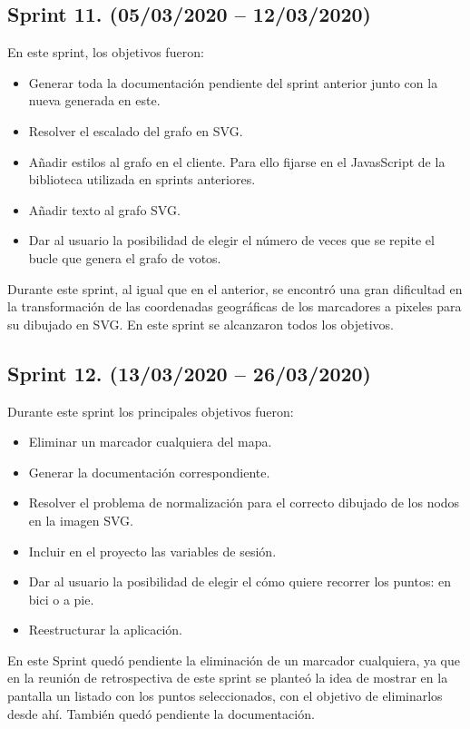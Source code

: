 \subsection{Sprint 11. (05/03/2020 -- 12/03/2020)}
En este sprint, los objetivos fueron:
\begin{itemize}
	\item Generar toda la documentación pendiente del sprint anterior junto con la nueva generada en este.
	\item Resolver el escalado del grafo en SVG.
	\item Añadir estilos al grafo en el cliente. Para ello fijarse en el JavasScript de la biblioteca utilizada en sprints anteriores.
	\item Añadir texto al grafo SVG.
	\item Dar al usuario la posibilidad de elegir el número de veces que se repite el bucle que genera el grafo de votos.
\end{itemize}
Durante este sprint, al igual que en el anterior, se encontró una gran dificultad en la transformación de las coordenadas geográficas de los marcadores a pixeles para su dibujado en SVG.
En este sprint se alcanzaron todos los objetivos.

\subsection{Sprint 12. (13/03/2020 -- 26/03/2020)}
Durante este sprint los principales objetivos fueron:
\begin{itemize}
	\item Eliminar un marcador cualquiera del mapa.
	\item Generar la documentación correspondiente.
	\item Resolver el problema de normalización para el correcto dibujado de los nodos en la imagen SVG.
	\item Incluir en el proyecto las variables de sesión.
	\item Dar al usuario la posibilidad de elegir el cómo quiere recorrer los puntos: en bici o a pie.
	\item Reestructurar la aplicación.
\end{itemize}
En este Sprint quedó pendiente la eliminación de un marcador cualquiera, ya que en la reunión de retrospectiva de este sprint se planteó la idea de mostrar en la pantalla un listado con los puntos seleccionados, con el objetivo de eliminarlos desde ahí. También quedó pendiente la documentación.

